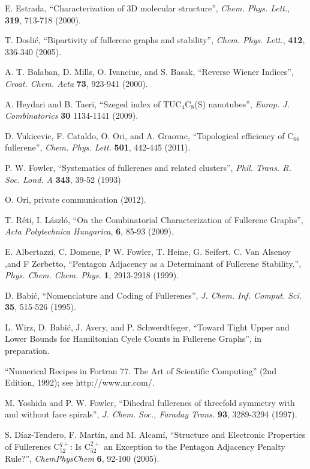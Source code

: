 \documentclass[article,a4paper,twoside]{memoir}
\newcommand{\C}[1]{\ensuremath{\mathrm{C}_{#1}}}
\begin{document}
\begin{thebibliography}{99}
 E. Estrada, ``Characterization of 3D molecular structure'', \textit{Chem. Phys. Lett.}, \textbf{319}, 713-718 (2000).

 T. Dosli\'c, ``Bipartivity of fullerene graphs and stability'', \textit{Chem. Phys. Lett.}, \textbf{412}, 336-340 (2005).

 A. T. Balaban, D. Mills, O. Ivanciuc, and S. Basak, ``Reverse Wiener Indices'', \textit{Croat. Chem. Acta} \textbf{73}, 923-941 (2000).

 A. Heydari and B. Taeri, ``Szeged index of TUC$_4$C$_8$(S) nanotubes'', \textit{Europ. J. Combinatorics} \textbf{30} 1134-1141 (2009). 

 D. Vukicevic, F. Cataldo, O. Ori, and A. Graovac, ``Topological efficiency of \C{66} fullerene'', \textit{Chem. Phys. Lett.} \textbf{501}, 442-445 (2011).

 P. W. Fowler, ``Systematics of fullerenes and related clusters'', \textit{Phil. Trans. R. Soc. Lond. A} \textbf{343}, 39-52 (1993) 

 O. Ori, private communication (2012).

 T. R\'eti, I. L\'aszl\'o, ``On the Combinatorial Characterization of Fullerene Graphs'', \textit{Acta Polytechnica Hungarica}, \textbf{6}, 85-93 (2009).

 E. Albertazzi, C. Domene,  P W. Fowler, T. Heine, G. Seifert, C. Van Alsenoy ,and F Zerbetto, ``Pentagon Adjacency as a Determinant of
Fullerene Stability,'', \textit{Phys. Chem. Chem. Phys.} \textbf{1}, 2913-2918 (1999). 

 D. Babi\'c, ``Nomenclature and Coding of Fullerenes'', \textit{J. Chem. Inf. Comput. Sci.} \textbf{35}, 515-526 (1995).

 L. Wirz, D. Babi\'c, J. Avery, and P. Schwerdtfeger, ``Toward Tight Upper and Lower Bounds for Hamiltonian Cycle Counts in Fullerene Graphs'', in preparation.

 ``Numerical Recipes in Fortran 77. The Art of Scientific Computing'' (2nd Edition, 1992); see http://www.nr.com/.

 M. Yoshida and P. W. Fowler, ``Dihedral fullerenes of threefold symmetry with and without
face spirals'', \textit{J. Chem. Soc., Faraday Trans.} \textbf{93}, 3289-3294 (1997). 

 S. D\'iaz-Tendero, F. Mart\'in, and M. Alcam\'i, ``Structure and Electronic Properties of Fullerenes C$_{52}^{q+}$: Is C$_{52}^{2+}$ an Exception to the Pentagon Adjacency Penalty Rule?'', \textit{ChemPhysChem} \textbf{6}, 92-100 (2005).


\end{thebibliography}
\end{document}
